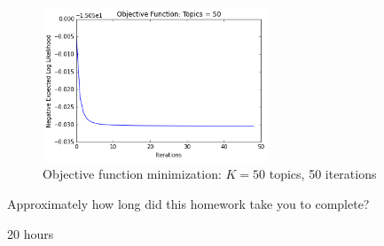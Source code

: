 \documentclass[submit]{harvardml}
\begin{document}
\newpage

\begin{figure}
	\centering
	\includegraphics[width=0.6\textwidth]{output_9_2.png}
	\caption{Objective function minimization: $K = 50$ topics, 50 iterations}
\end{figure}


\clearpage
\begin{problem}[Calibration, 1pt]
Approximately how long did this homework take you to complete?
\end{problem}

20 hours
\end{document}
